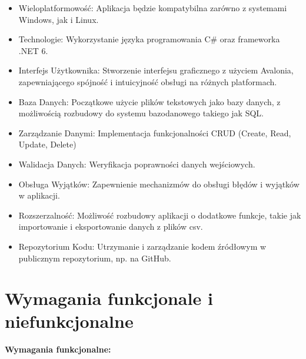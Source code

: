 \begin{itemize}
\item Wieloplatformowość: Aplikacja będzie kompatybilna zarówno z systemami Windows, jak i Linux.
\item Technologie: Wykorzystanie języka programowania C\# oraz frameworka .NET 6.
\item Interfejs Użytkownika: Stworzenie interfejsu graficznego z użyciem Avalonia, zapewniającego spójność i intuicyjność obsługi na różnych platformach.
\item Baza Danych: Początkowe użycie plików tekstowych jako bazy danych, z możliwością rozbudowy do systemu bazodanowego takiego jak SQL.
\item Zarządzanie Danymi: Implementacja funkcjonalności CRUD (Create, Read, Update, Delete) 
\item Walidacja Danych: Weryfikacja poprawności danych wejściowych.
\item Obsługa Wyjątków: Zapewnienie mechanizmów do obsługi błędów i wyjątków w aplikacji.
\item Rozszerzalność: Możliwość rozbudowy aplikacji o dodatkowe funkcje, takie jak importowanie i eksportowanie danych z plików csv.
\item Repozytorium Kodu: Utrzymanie i zarządzanie kodem źródłowym w publicznym repozytorium, np. na GitHub.
\end{itemize}


\section{Wymagania funkcjonale i niefunkcjonalne}

\noindent \textbf{Wymagania funkcjonalne:}

